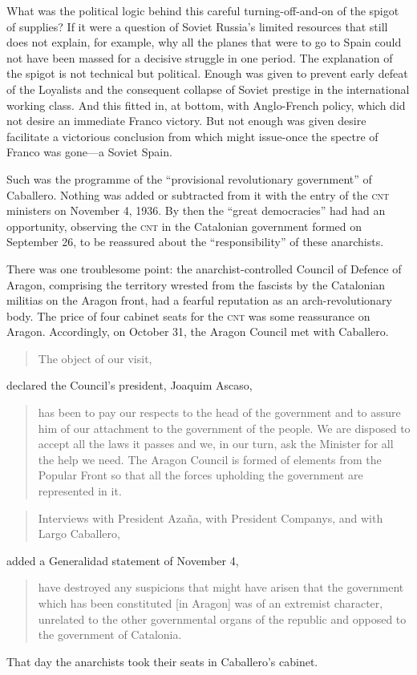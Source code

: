 What was the political logic behind this careful turning-off-and-on of the spigot of supplies? If it were a question of Soviet Russia’s limited resources that still does not explain, for example, why all the planes that were to go to Spain could not have been massed for a decisive struggle in one period. The explanation of the spigot is not technical but political. Enough was given to prevent early defeat of the Loyalists and the consequent collapse of Soviet prestige in the international working class. And this fitted in, at bottom, with Anglo-French policy, which did not desire an immediate Franco victory. But not enough was given desire facilitate a victorious conclusion from which might issue-once the spectre of Franco was gone---a Soviet Spain.

Such was the programme of the ``provisional revolutionary government'' of Caballero. Nothing was added or subtracted from it with the entry of the \textsc{cnt} ministers on November 4, 1936. By then the ``great democracies'' had had an opportunity, observing the \textsc{cnt} in the Catalonian government formed on September 26, to be reassured about the ``responsibility'' of these anarchists.

There was one troublesome point: the anarchist-controlled Council of Defence of Aragon, comprising the territory wrested from the fascists by the Catalonian militias on the Aragon front, had a fearful reputation as an arch-revolutionary body. The price of four cabinet seats for the \textsc{cnt} was some reassurance on Aragon. Accordingly, on October 31, the Aragon Council met with Caballero.

\begin{quotation}
	The object of our visit,
\end{quotation}
declared the Council’s president, Joaquim Ascaso,

\begin{quotation}
  \noindent
  has been to pay our respects to the head of the government and to assure him of our attachment to the government of the people. We are disposed to accept all the laws it passes and we, in our turn, ask the Minister for all the help we need. The Aragon Council is formed of elements from the Popular Front so that all the forces upholding the government are represented in it.
\end{quotation}

\begin{quotation}
  Interviews with President Azaña, with President Companys, and with Largo Caballero,
\end{quotation}
added a Generalidad statement of November 4,

\begin{quotation}
  \noindent
  have destroyed any suspicions that might have arisen that the government which has been constituted [in Aragon] was of an extremist character, unrelated to the other governmental organs of the republic and opposed to the government of Catalonia.
\end{quotation}
  
That day the anarchists took their seats in Caballero’s cabinet.